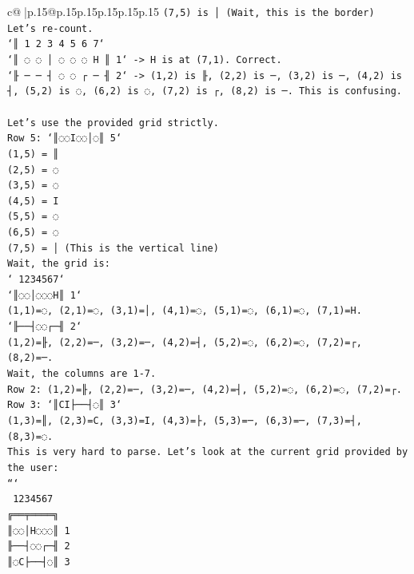 \documentclass{article}
\begin{document}
{\begin{supertabular}{c@{$\;$}|p{.15\linewidth}@{}p{.15\linewidth}p{.15\linewidth}p{.15\linewidth}p{.15\linewidth}p{.15\linewidth}}
{{{\texttt{(7,5) is │ (Wait, this is the border)} \\
\texttt{Let's re{-}count.} \\
\texttt{`║ 1 2 3 4 5 6 7`} \\
\texttt{`║ ◌ ◌ │ ◌ ◌ ◌ H ║ 1` {-}> H is at (7,1). Correct.} \\
\texttt{`╟ ─ ─ ┤ ◌ ◌ ┌ ─ ╢ 2` {-}> (1,2) is ╟, (2,2) is ─, (3,2) is ─, (4,2) is ┤, (5,2) is ◌, (6,2) is ◌, (7,2) is ┌, (8,2) is ─. This is confusing.} \\
\\ 
\texttt{Let's use the provided grid strictly.} \\
\texttt{Row 5: `║◌◌I◌◌│◌║ 5`} \\
\texttt{(1,5) = ║} \\
\texttt{(2,5) = ◌} \\
\texttt{(3,5) = ◌} \\
\texttt{(4,5) = I} \\
\texttt{(5,5) = ◌} \\
\texttt{(6,5) = ◌} \\
\texttt{(7,5) = │ (This is the vertical line)} \\
\texttt{Wait, the grid is:} \\
\texttt{` 1234567`} \\
\texttt{`║◌◌│◌◌◌H║ 1`} \\
\texttt{(1,1)=◌, (2,1)=◌, (3,1)=│, (4,1)=◌, (5,1)=◌, (6,1)=◌, (7,1)=H.} \\
\texttt{`╟──┤◌◌┌─╢ 2`} \\
\texttt{(1,2)=╟, (2,2)=─, (3,2)=─, (4,2)=┤, (5,2)=◌, (6,2)=◌, (7,2)=┌, (8,2)=─.} \\
\texttt{Wait, the columns are 1{-}7.} \\
\texttt{Row 2: (1,2)=╟, (2,2)=─, (3,2)=─, (4,2)=┤, (5,2)=◌, (6,2)=◌, (7,2)=┌.} \\
\texttt{Row 3: `║CI├──┤◌║ 3`} \\
\texttt{(1,3)=║, (2,3)=C, (3,3)=I, (4,3)=├, (5,3)=─, (6,3)=─, (7,3)=┤, (8,3)=◌.} \\
\texttt{This is very hard to parse. Let's look at the current grid provided by the user:} \\
\texttt{```} \\
\texttt{ 1234567} \\
\texttt{╔══╤════╗} \\
\texttt{║◌◌│H◌◌◌║ 1} \\
\texttt{╟──┤◌◌┌─╢ 2} \\
\texttt{║◌C├──┤◌║ 3} \\
}}}
\end{supertabular}}
\end{document}

